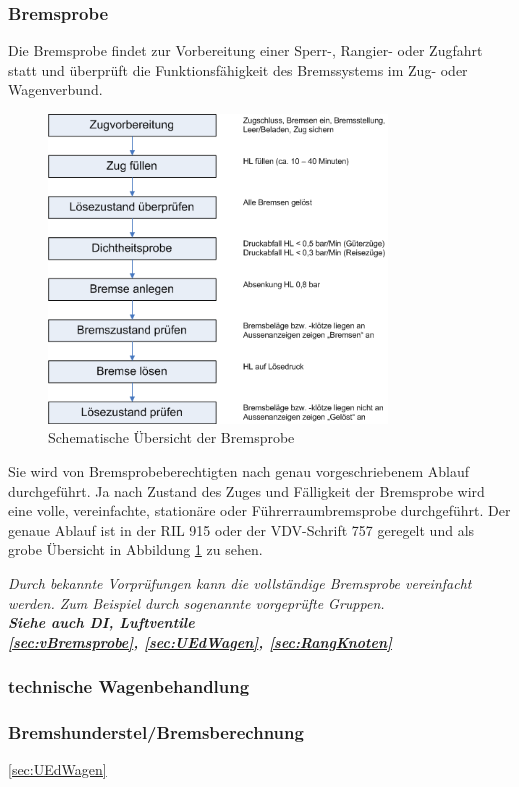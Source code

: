 \subsubsection{Bremsprobe}
Die Bremsprobe findet zur Vorbereitung einer Sperr-, Rangier- oder Zugfahrt statt und überprüft die Funktionsfähigkeit des Bremssystems im Zug- oder Wagenverbund.\par
\begin{figure}[htbp] 
    \begin{center}
            \includegraphics[width=9cm]{Bilder/bremsprobe.png}
            \caption{Schematische Übersicht der Bremsprobe}
            \label{fig:Bremsprobe}
    \end{center}
\end{figure} 
Sie wird von Bremsprobeberechtigten nach genau vorgeschriebenem Ablauf durchgeführt. Ja nach Zustand des Zuges und Fälligkeit der Bremsprobe wird eine volle, vereinfachte, stationäre oder Führerraumbremsprobe durchgeführt. Der genaue Ablauf ist in der RIL 915 oder der VDV-Schrift 757 geregelt und als grobe Übersicht in Abbildung \ref{fig:Bremsprobe} zu sehen.\par
\textit{Durch bekannte Vorprüfungen kann die vollständige Bremsprobe vereinfacht werden. Zum Beispiel durch sogenannte vorgeprüfte Gruppen.\\
\textbf{Siehe auch DI, Luftventile\\
\ref{sec:vBremsprobe}, \ref{sec:UEdWagen}, \ref{sec:RangKnoten}}}
\subsubsection{technische Wagenbehandlung}
\subsubsection{Bremshunderstel/Bremsberechnung}
\ref{sec:UEdWagen}

